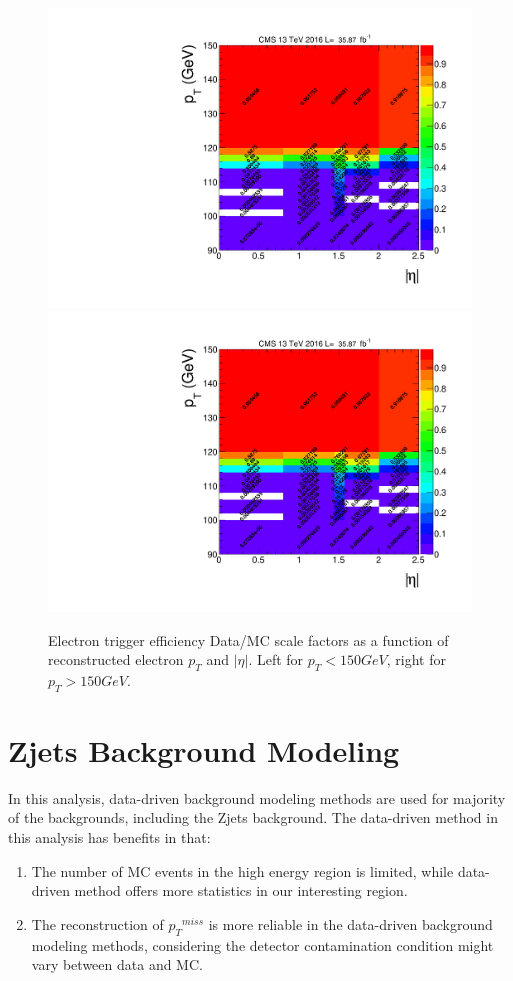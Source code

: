 \begin{figure}[htpb]
\begin{center}
\includegraphics[width=0.49\linewidth, page=5]{figures/hlt115electron_2016fulleff_absetapt.pdf}
\includegraphics[width=0.49\linewidth, page=6]{figures/hlt115electron_2016fulleff_absetapt.pdf}
\caption{Electron trigger efficiency Data/MC scale factors as a function of reconstructed electron $p_T$ and $|\eta|$. Left for $p_T <150 GeV$, right for $p_T >150GeV$. }
\label{fig:trgeff_el_sf}
\end{center}
\end{figure}

\clearpage
\section{Zjets Background Modeling}\label{sec:dybk}
In this analysis, data-driven background modeling methods are used for majority of the backgrounds, including the Zjets background. The data-driven method in this analysis has benefits in that:
\begin{enumerate}
\item The number of MC events in the high energy region is limited, while data-driven method offers more statistics in our interesting region.
\item The reconstruction of ${p_{T}}^{miss}$ is more reliable in the data-driven background modeling methods, considering the detector contamination condition might vary between data and MC.
\end{enumerate}

